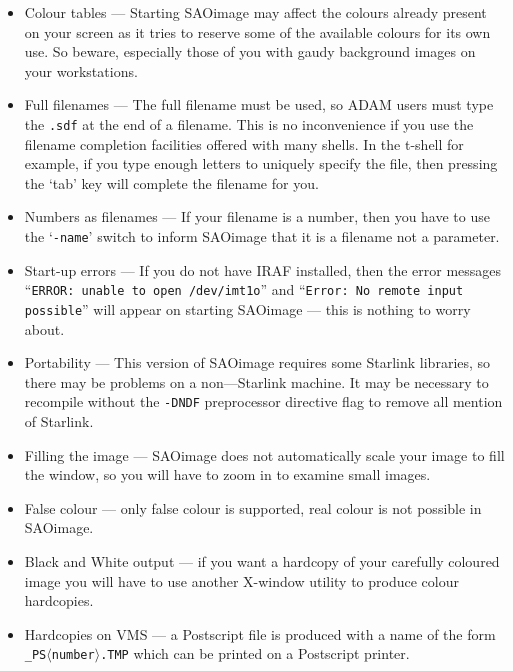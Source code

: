 \begin{itemize}

\item{Colour tables --- Starting SAOimage may affect the colours already
present on your screen as it tries to reserve some of the available
colours for its own use. So beware, especially those of you with gaudy
background images on your workstations.}

\item{Full filenames --- The full filename must be used, so ADAM users must
type the {\tt .sdf} at the end of  a filename. This is no inconvenience if you
use the filename completion facilities offered with many shells. In the t-shell
for example, if you type enough letters to uniquely specify the file, then
pressing the `tab' key will complete the filename for you.}

\item{Numbers as filenames --- If your filename is a number, then you have to
use the `{\tt -name}' switch to  inform SAOimage that it is a filename not a 
parameter.}

\item{Start-up errors --- If you do not have IRAF installed, then the error
messages ``{\tt ERROR: unable to open /dev/imt1o}'' and ``{\tt Error:
No remote input possible}'' will appear on starting SAOimage --- this
is nothing to worry about.}

\item{Portability --- This version of SAOimage requires some Starlink 
libraries, so there may be problems on a non---Starlink machine. It may
be necessary to recompile without the {\tt -DNDF} preprocessor directive
flag to remove all mention of Starlink.}

\item{Filling the image --- SAOimage does not automatically scale your image
to fill the window, so you will have to zoom in to examine small images.}

\item{False colour --- only false colour is supported, real colour is not
possible in SAOimage.}

\item{Black and White output --- if you want a hardcopy of your carefully
coloured image you will have to use another X-window utility to
produce colour hardcopies.}  

\item{Hardcopies on VMS --- a Postscript file is produced with a name
of the form {\tt \_PS$\langle$number$\rangle$.TMP} which can be printed on a
Postscript printer.}


\end{itemize}
